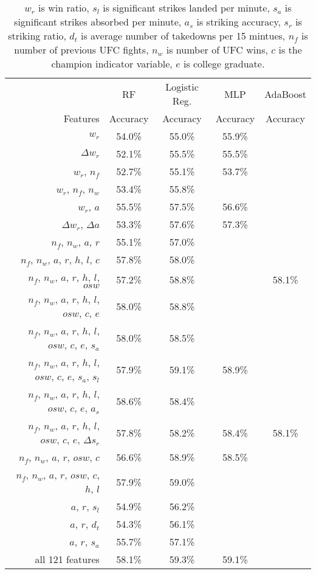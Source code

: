 \begin{center}
\begin{table}[h]
\begin{tabular}{r|cccc}
\toprule
         & RF       & Logistic Reg. & MLP      & AdaBoost\\
Features & Accuracy & Accuracy      & Accuracy & Accuracy\\
\hline
$w_r$ & 54.0\% & 55.0\% & 55.9\% & \\
$\Delta w_r$ & 52.1\% & 55.5\% & 55.5\% & \\
$w_r$, $n_f$ & 52.7\% & 55.1\% & 53.7\% & \\
$w_r$, $n_f$, $n_w$ & 53.4\% & 55.8\% &  & \\
$w_r$, $a$ & 55.5\% & 57.5\% & 56.6\% & \\
$\Delta w_r$, $\Delta a$ & 53.3\% & 57.6\% & 57.3\% & \\
$n_f$, $n_w$, $a$, $r$ & 55.1\% & 57.0\% \\
$n_f$, $n_w$, $a$, $r$, $h$, $l$, $c$ & 57.8\% & 58.0\% & &\\
$n_f$, $n_w$, $a$, $r$, $h$, $l$, $osw$ & 57.2\% & 58.8\% & & 58.1\%\\
$n_f$, $n_w$, $a$, $r$, $h$, $l$, $osw$, $c$, $e$ & 58.0\% & 58.8\% & &\\
$n_f$, $n_w$, $a$, $r$, $h$, $l$, $osw$, $c$, $e$, $s_a$ & 58.0\% & 58.5\% & & \\
$n_f$, $n_w$, $a$, $r$, $h$, $l$, $osw$, $c$, $e$, $s_a$, $s_l$ & 57.9\% &59.1\% &58.9\% & \\
$n_f$, $n_w$, $a$, $r$, $h$, $l$, $osw$, $c$, $e$, $a_s$ & 58.6\% & 58.4\% \\
$n_f$, $n_w$, $a$, $r$, $h$, $l$, $osw$, $c$, $e$, $\Delta s_r$ & 57.8\% & 58.2\% & 58.4\% & 58.1\%\\
$n_f$, $n_w$, $a$, $r$, $osw$, $c$ & 56.6\% & 58.9\% & 58.5\% \\
$n_f$, $n_w$, $a$, $r$, $osw$, $c$, $h$, $l$ & 57.9\% & 59.0\% & &\\
$a$, $r$, $s_l$ & 54.9\% & 56.2\% & & \\
$a$, $r$, $d_t$ & 54.3\% & 56.1\% & & \\
$a$, $r$, $s_a$ & 55.7\% & 57.1\% & & \\
all 121 features & 58.1\% & 59.3\% & 59.1\% & \\
\bottomrule
\end{tabular}
\caption{$w_r$ is win ratio, $s_l$ is significant strikes landed per minute,
$s_a$ is significant strikes absorbed per minute, $a_s$ is striking accuracy,
$s_r$ is striking ratio, $d_t$ is average number of takedowns per 15 mintues,
$n_f$ is number of previous UFC fights, $n_w$ is number
of UFC wins, $c$ is the champion indicator variable, $e$ is college graduate.}
\label{other_features}
\end{table}
\end{center}




